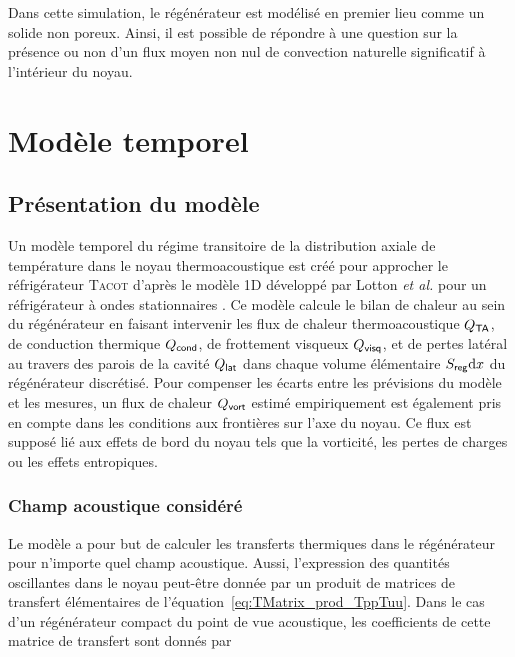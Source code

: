 Dans cette simulation, le régénérateur est modélisé en premier lieu comme un solide non poreux. Ainsi, il est possible de répondre à une question sur la présence ou non d'un flux moyen non nul de convection naturelle significatif à l'intérieur du noyau.

\section{Modèle temporel} \label{chap:ModeleTemporel}
\subsection{Présentation du modèle}
Un modèle temporel du régime transitoire de la distribution axiale de température dans le noyau thermoacoustique est créé pour approcher le réfrigérateur \textsc{Tacot} d'après le modèle 1D développé par Lotton \textit{et al.} pour un réfrigérateur à ondes stationnaires \cite{lotton_transient_2009}. Ce modèle calcule le bilan de chaleur au sein du régénérateur en faisant intervenir les flux de chaleur thermoacoustique $Q_{\sf TA}$, de conduction thermique $Q_{\sf cond}$, de frottement visqueux $Q_{\sf visq}$, et de pertes latéral au travers des parois de la cavité $Q_{\sf lat}$ dans chaque volume élémentaire $S_{\sf reg} \mathrm{d} x$ du régénérateur discrétisé. Pour compenser les écarts entre les prévisions du modèle et les mesures, un flux de chaleur $Q_{\sf vort}$ estimé empiriquement est également pris en compte dans les conditions aux frontières sur l'axe du noyau. Ce flux est supposé lié aux effets de bord du noyau tels que la vorticité, les pertes de charges ou les effets entropiques. 

\subsubsection{Champ acoustique considéré}
Le modèle a pour but de calculer les transferts thermiques dans le régénérateur pour n'importe quel champ acoustique. Aussi, l'expression des quantités oscillantes dans le noyau peut-être donnée par un produit de matrices de transfert élémentaires de l'équation~\eqref{eq:TMatrix_prod_TppTuu}. Dans le cas d'un régénérateur compact du point de vue acoustique, les coefficients de cette matrice de transfert sont donnés par


